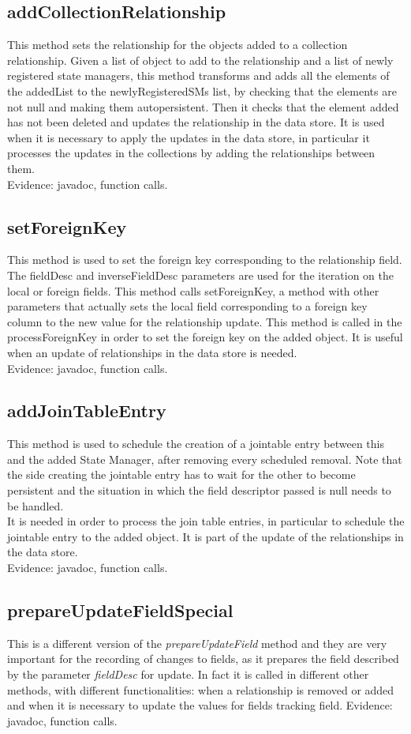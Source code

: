 \documentclass[18pt,oneside,a4paper, titlepage]{article}
\begin{document}
	\subsection{addCollectionRelationship}
		This method sets the relationship for the objects added to a collection relationship. Given a list of object to add to the relationship and a list of newly registered state managers, this method transforms and adds all the elements of the addedList to the newlyRegisteredSMs list, by checking that the elements are not null and making them autopersistent. Then it checks that the element added has not been deleted and updates the relationship in the data store.
		It is used when it is necessary to apply the updates in the data store, in particular it processes the updates in the collections by adding the relationships between them.\\		
		Evidence: javadoc, function calls.
	\subsection{setForeignKey}
		This method is used to set the foreign key corresponding to the relationship field. The fieldDesc and inverseFieldDesc parameters are used for the iteration on the local or foreign fields. This method calls setForeignKey, a method with other parameters that actually sets the local field corresponding to a foreign key column to the new value for the relationship update.
		This method is called in the processForeignKey in order to set the foreign key on the added object. It is useful when an update of relationships in the data store is needed.\\		
		Evidence: javadoc, function calls.
	\subsection{addJoinTableEntry}
		This method is used to schedule the creation of a jointable entry between this and the added State Manager, after removing every scheduled removal. Note that the side creating the jointable entry has to wait for the other to become persistent and the situation in which the field descriptor passed is null needs to be handled.\\
		It is needed in order to process the join table entries, in particular to schedule the jointable entry to the added object. It is part of the update of the relationships in the data store.\\
		Evidence: javadoc, function calls.
	\subsection{prepareUpdateFieldSpecial}
		This is a different version of the \textit{prepareUpdateField} method and they are  very important for the recording of changes to fields, as it prepares the field described by the parameter \textit{fieldDesc} for update. In fact it is called in different other methods, with different functionalities: when a relationship is removed or added and when it is necessary to update the values for fields tracking field.
		Evidence: javadoc, function calls.
\end{document}
